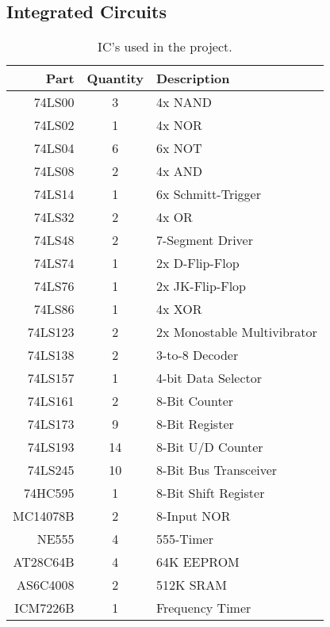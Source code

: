\subsection{Integrated Circuits}
\begin{table}[H]
  \centering
  \begin{tabular}{r|c|l}
    Part                     & Quantity & Description \\\hline
    74LS00                   & 3 & 4x NAND \\
    74LS02                   & 1 & 4x NOR \\
    74LS04                   & 6 & 6x NOT \\
    74LS08                   & 2 & 4x AND \\
    74LS14                   & 1 & 6x Schmitt-Trigger \\
    74LS32                   & 2 & 4x OR \\
    74LS48                   & 2 & 7-Segment Driver  \\
    74LS74                   & 1 & 2x D-Flip-Flop  \\
    74LS76                   & 1 & 2x JK-Flip-Flop  \\
    74LS86                   & 1 & 4x XOR  \\
    74LS123                  & 2 & 2x Monostable Multivibrator  \\
    74LS138                  & 2 & 3-to-8 Decoder  \\
    74LS157                  & 1 & 4-bit Data Selector \\
    74LS161                  & 2 & 8-Bit Counter  \\
    74LS173                  & 9 & 8-Bit Register  \\
    74LS193                  & 14 & 8-Bit U/D Counter  \\
    74LS245                  & 10 & 8-Bit Bus Transceiver  \\
    74HC595                  & 1 & 8-Bit Shift Register  \\
    MC14078B                 & 2 & 8-Input NOR  \\
    NE555                    & 4 & 555-Timer \\
    AT28C64B                 & 4 & 64K EEPROM  \\
    AS6C4008                 & 2 & 512K SRAM  \\
    ICM7226B                 & 1 & Frequency Timer  \\
  \end{tabular}
  \caption{IC's used in the project.}
  \label{tab:parts}
\end{table}

